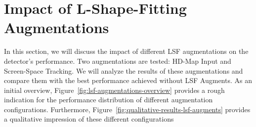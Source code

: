 
\section{Impact of L-Shape-Fitting Augmentations}
\label{sec:lsf-aug-impact}

In this section, we will discuss the impact of different LSF augmentations on the detector's performance.
Two augmentations are tested: HD-Map Input and Screen-Space Tracking.
We will analyze the results of these augmentations and compare them with the best performance achieved without LSF Augments.
As an initial overview, Figure~\ref{fig:lsf-augmentations-overview} provides a rough indication for the performance distribution of different augmentation configurations.
Furthermore, Figure~\ref{fig:qualitative-results-lsf-augments} provides a qualitative impression of these different configurations

